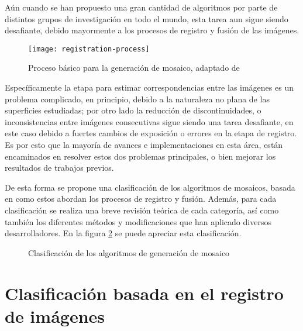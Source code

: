 Aún cuando se han propuesto una gran cantidad de algoritmos por parte de distintos grupos de investigación en todo el mundo, esta tarea aun sigue siendo desafiante, debido mayormente a los procesos de registro y fusión de las imágenes.

\begin{figure}[H]
	\centerline{
		\texttt{[image: registration-process]}}
	\caption[Proceso básico para la generación de mosaico]{Proceso básico para la generación de mosaico, adaptado de \cite{capel}}
	\label{imagen:mosaic-process}
\end{figure}

Específicamente la etapa para estimar correspondencias entre las imágenes es un problema complicado, en principio, debido a la naturaleza no plana de las superficies estudiadas; por otro lado la reducción de discontinuidades, o inconsistencias entre imágenes consecutivas sigue siendo una tarea desafiante, en este caso debido a fuertes cambios de exposición o errores en la etapa de registro. Es por esto que la mayoría de avances e implementaciones en esta área, están encaminados en resolver estos dos problemas principales, o bien mejorar los resultados de trabajos previos.

De esta forma se propone una clasificación de los algoritmos de mosaicos, basada en como estos abordan los procesos de registro y fusión. Además, para cada clasificación se realiza una breve revisión teórica de cada categoría, así como también los diferentes métodos y modificaciones que han aplicado diversos desarrolladores. En la figura \ref{imagen:clasificacion} se puede apreciar esta clasificación.


\begin{figure}
	\centering     %
	\hspace{5mm}%
	\caption{Clasificación de los algoritmos de generación de mosaico}
	\label{imagen:clasificacion}
\end{figure}


\section*{Clasificación basada en el registro de imágenes}

